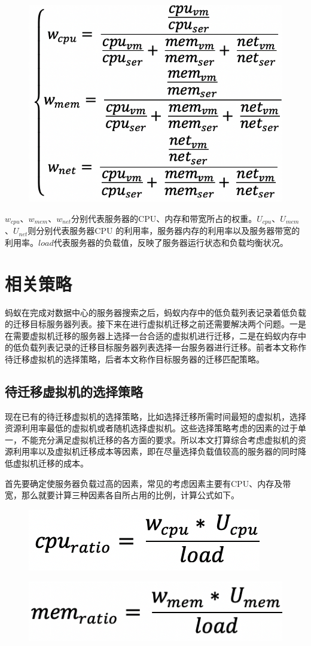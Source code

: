  \begin{figure}[ht]
  \centering
  \includegraphics[width=0.3\linewidth]{./Figure/IMG_Chap3_8.png}
\end{figure}

$ w_{cpu} $、$ w_{mem} $、$ w_{net} $分别代表服务器的CPU、内存和带宽所占的权重。$ U_{cpu} $、$ U_{mem} $、$ U_{net} $则分别代表服务器CPU 的利用率，服务器内存的利用率以及服务器带宽的利用率。$ load $代表服务器的负载值，反映了服务器运行状态和负载均衡状况。

\section{相关策略}
蚂蚁在完成对数据中心的服务器搜索之后，蚂蚁内存中的低负载列表记录着低负载的迁移目标服务器列表。接下来在进行虚拟机迁移之前还需要解决两个问题。一是在需要虚拟机迁移的服务器上选择一台合适的虚拟机进行迁移，二是在蚂蚁内存中的低负载列表记录的迁移目标服务器列表选择一台服务器进行迁移。前者本文称作待迁移虚拟机的选择策略，后者本文称作目标服务器的迁移匹配策略。

\subsection{待迁移虚拟机的选择策略}
现在已有的待迁移虚拟机的选择策略，比如选择迁移所需时间最短的虚拟机，选择资源利用率最低的虚拟机或者随机选择虚拟机。这些选择策略考虑的因素的过于单一，不能充分满足虚拟机迁移的各方面的要求。所以本文打算综合考虑虚拟机的资源利用率以及虚拟机迁移成本等因素，即在尽量选择负载值较高的服务器的同时降低虚拟机迁移的成本。

首先要确定使服务器负载过高的因素，常见的考虑因素主要有CPU、内存及带宽，那么就要计算三种因素各自所占用的比例，计算公式如下。

 \begin{figure}[htbp]
  \centering
  \includegraphics[width=0.3\linewidth]{./Figure/IMG_Chap3_9.png}
\end{figure}

 \begin{figure}[htbp]
  \centering
  \includegraphics[width=0.3\linewidth]{./Figure/IMG_Chap3_10.png}
\end{figure}

